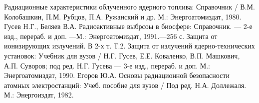 \begin{thebibliography}{9}
	 Радиационные характеристики облученного ядерного топлива: Справочник / В.М. Колобашкин, П.М. Рубцов, П.А. Ружанский и др. М.: Энергоатомиздат, 1980.
	 Гусев Н.Г., Беляев В.А. Радиоактивные выбрсоы в биосфере: Справочник. --- 2-е изд., перераб. и доп.
	---М.: Энергоатомиздат, 1991.---256 с.
	 Защита от ионизирующих излучений. В 2-х т. Т.2. Защита от излучений ядерно-технических установок: Учебник для вузов / Н.Г. Гусев, Е.Е. Коваленко, В.П. Машкович, А.П. Суворов; под ред. Н.Г. Гусева --- 3-е изд., перераб. и доп. М.: Энергоатомиздат, 1990.
	 Егоров Ю.А. Основы радиационной безопасности атомных электростанций: Учеб. пособие для вузов / Под ред. Н.А. Доллежаля. М.: Энергоиздат, 1982.
\end{thebibliography}